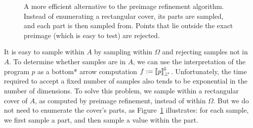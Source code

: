 \begin{figure}[tb!]
{}%
\betweenrefinementfigurehspace%

\caption[Preimage refinement sampling]{A more efficient alternative to the preimage refinement algorithm.
Instead of enumerating a rectangular cover, its parts are sampled, and each part is then sampled from.
Points that lie outside the exact preimage (which is easy to test) are rejected.
}
\label{fig:preimage-refinement-sampling}
\end{figure}

It is easy to sample within $A$ by sampling within $\Omega$ and rejecting samples not in $A$.
To determine whether samples are in $A$, we can use the interpretation of the program $\mathit{p}$ as a bottom* arrow computation $f := \left\llbracket{\mathit{p}}\right\rrbracket^{\mspace{-2mu}\Downarrow\mspace{-2mu}}_{\bot^{\mspace{-4mu}*}}$.
Unfortunately, the time required to accept a fixed number of samples also tends to be exponential in the number of dimensions.
To solve this problem, we sample within a rectangular cover of $A$, as computed by preimage refinement, instead of within $\Omega$.
But we do not need to enumerate the cover's parts, as Figure~\ref{fig:preimage-refinement-sampling} illustrates: for each sample, we first sample a part, and then sample a value within the part.

